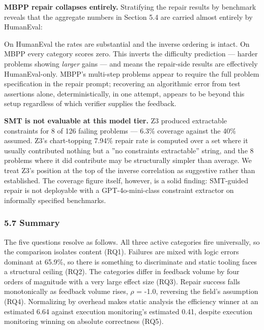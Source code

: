 \textbf{MBPP repair collapses entirely.} Stratifying the repair results by benchmark reveals that the aggregate numbers in Section 5.4 are carried almost entirely by HumanEval:

\begin{table}[htbp]
\centering
{}
\end{table}

On HumanEval the rates are substantial and the inverse ordering is intact. On MBPP every category scores zero. This inverts the difficulty prediction --- harder problems showing \textit{larger} gains --- and means the repair-side results are effectively HumanEval-only. MBPP's multi-step problems appear to require the full problem specification in the repair prompt; recovering an algorithmic error from test assertions alone, deterministically, in one attempt, appears to be beyond this setup regardless of which verifier supplies the feedback.

\textbf{SMT is not evaluable at this model tier.} Z3 produced extractable constraints for 8 of 126 failing problems --- 6.3\% coverage against the 40\% assumed. Z3's chart-topping 7.94\% repair rate is computed over a set where it usually contributed nothing but a ''no constraints extractable'' string, and the 8 problems where it did contribute may be structurally simpler than average. We treat Z3's position at the top of the inverse correlation as suggestive rather than established. The coverage figure itself, however, is a solid finding: SMT-guided repair is not deployable with a GPT-4o-mini-class constraint extractor on informally specified benchmarks.

\subsubsection{5.7 Summary}

The five questions resolve as follows. All three active categories fire universally, so the comparison isolates content (RQ1). Failures are mixed with logic errors dominant at 65.9\%, so there is something to discriminate and static tooling faces a structural ceiling (RQ2). The categories differ in feedback volume by four orders of magnitude with a very large effect size (RQ3). Repair success falls monotonically as feedback volume rises, $\rho$ = -1.0, reversing the field's assumption (RQ4). Normalizing by overhead makes static analysis the efficiency winner at an estimated 6.64 against execution monitoring's estimated 0.41, despite execution monitoring winning on absolute correctness (RQ5).

